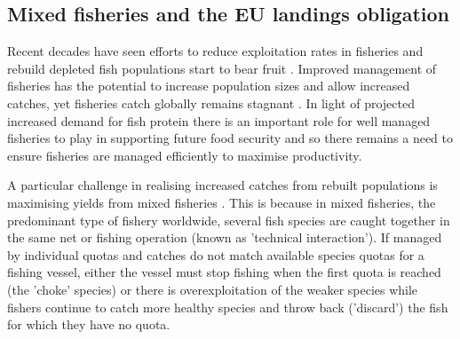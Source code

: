 \documentclass{nature}
\begin{document}
\begin{linenumbers}
\begin{abstract}
[304 words]

\end{abstract}

\section*{}

\subsection{Mixed fisheries and the EU landings obligation} 

Recent decades have seen efforts to reduce exploitation rates in fisheries and
rebuild depleted fish populations start to bear fruit \cite{Worm2009}.
Improved management of fisheries has the potential to increase population sizes
and allow increased catches, yet fisheries catch globally remains stagnant
\cite{FAO2016}.  In light of projected increased demand for fish protein
\cite{B??n??2016} there is an important role for well managed fisheries to play
in supporting future food security \cite{Mcclanahan2015} and so there remains a
need to ensure fisheries are managed efficiently to maximise productivity.

A particular challenge in realising increased catches from rebuilt populations
is maximising yields from mixed fisheries \cite{Branch2008, Kuriyama2016,
	Ulrich2016}. This is because in mixed fisheries, the predominant type
of fishery worldwide, several fish species are caught together in the same net
or fishing operation (known as 'technical interaction'). If managed by
individual quotas and catches do not match available species quotas for a
fishing vessel, either the vessel must stop fishing when the first quota is
reached (the 'choke' species) or there is overexploitation of the weaker
species while fishers continue to catch more healthy species and throw back
('discard') the fish for which they have no quota.


\end{linenumbers}
\end{document}
